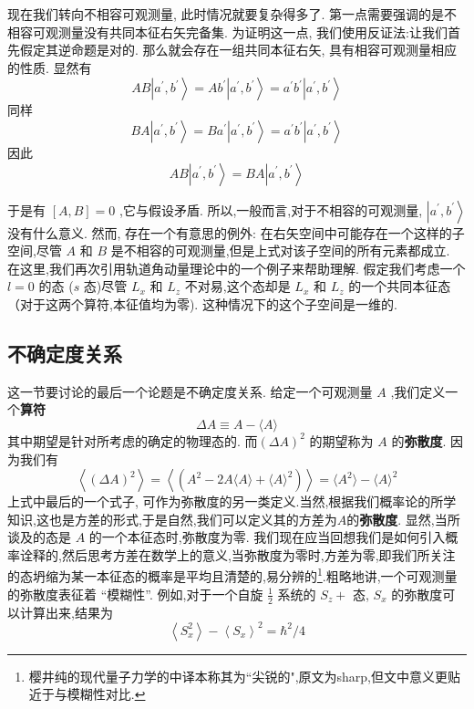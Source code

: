 \documentclass[lang=cn,newtx,10pt,scheme=chinese,thmcnt=section]{elegantbook}
\begin{document}
现在我们转向不相容可观测量, 此时情况就要复杂得多了. 第一点需要强调的是不相容可观测量没有共同本征右矢完备集. 为证明这一点, 我们使用反证法:让我们首先假定其逆命题是对的. 那么就会存在一组共同本征右矢, 具有相容可观测量相应的性质. 显然有
\begin{equation}
	{AB}\left| {{a}^{\prime },{b}^{\prime }}\right\rangle = A{b}^{\prime }\left| {{a}^{\prime },{b}^{\prime }}\right\rangle = {a}^{\prime }{b}^{\prime }\left| {{a}^{\prime },{b}^{\prime }}\right\rangle
\end{equation}
同样
\begin{equation}
	{BA}\left| {{a}^{\prime },{b}^{\prime }}\right\rangle = B{a}^{\prime }\left| {{a}^{\prime },{b}^{\prime }}\right\rangle = {a}^{\prime }{b}^{\prime }\left| {{a}^{\prime },{b}^{\prime }}\right\rangle
\end{equation}
因此
\begin{equation}
	{AB}\left| {{a}^{\prime },{b}^{\prime }}\right\rangle = {BA}\left| {{a}^{\prime },{b}^{\prime }}\right\rangle
\end{equation}

于是有 $\left\lbrack {A, B}\right\rbrack = 0$ ,它与假设矛盾. 所以,一般而言,对于不相容的可观测量, $\left| {{a}^{\prime },{b}^{\prime }}\right\rangle$ 没有什么意义. 然而, 存在一个有意思的例外: 在右矢空间中可能存在一个这样的子空间,尽管 $A$ 和 $B$ 是不相容的可观测量,但是上式对该子空间的所有元素都成立. 在这里,我们再次引用轨道角动量理论中的一个例子来帮助理解. 假定我们考虑一个 $l = 0$ 的态 ($s$ 态)尽管 ${L}_{x}$ 和 ${L}_{z}$ 不对易,这个态却是 ${L}_{x}$ 和 ${L}_{z}$ 的一个共同本征态（对于这两个算符,本征值均为零). 这种情况下的这个子空间是一维的.
\subsection*{不确定度关系}
这一节要讨论的最后一个论题是不确定度关系. 给定一个可观测量 $A$ ,我们定义一个\textbf{算符}
\begin{equation}
	{\Delta A} \equiv A - \langle A\rangle
\end{equation}
其中期望是针对所考虑的确定的物理态的. 而${\left( \Delta A\right) }^{2}$ 的期望称为 $A$ 的\textbf{弥散度}. 因为我们有
\begin{equation}
	\left\langle {\left( \Delta A\right) }^{2}\right\rangle = \left\langle \left( {{A}^{2} - {2A}\langle A\rangle +\langle A{\rangle }^{2}}\right) \right\rangle = \langle {A}^{2}\rangle - \langle A{\rangle }^{2}
\end{equation}
上式中最后的一个式子, 可作为弥散度的另一类定义.当然,根据我们概率论的所学知识,这也是方差的形式,于是自然,我们可以定义其的方差为$A$的\textbf{弥散度}. 显然,当所谈及的态是 $A$ 的一个本征态时,弥散度为零. 我们现在应当回想我们是如何引入概率诠释的,然后思考方差在数学上的意义,当弥散度为零时,方差为零,即我们所关注的态坍缩为某一本征态的概率是平均且清楚的,易分辨的\footnote{樱井纯的现代量子力学的中译本称其为``尖锐的",原文为sharp,但文中意义更贴近于与模糊性对比.}.粗略地讲,一个可观测量的弥散度表征着 “模糊性”. 例如,对于一个自旋 $\frac{1}{2}$ 系统的 ${S}_{z} +$ 态, ${S}_{x}$ 的弥散度可以计算出来,结果为
\begin{equation}
	\left\langle {S}_{x}^{2}\right\rangle - {\left\langle {S}_{x}\right\rangle }^{2} = {\hbar }^{2}/4
\end{equation}
\end{document}
